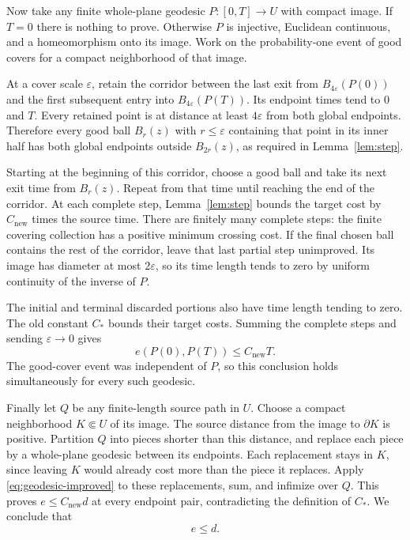\documentclass[11pt]{article}
\theoremstyle{definition}
\theoremstyle{remark}
\newcommand{\eps}{\varepsilon}
\begin{document}
Now take any finite whole-plane geodesic $P:[0,T]\to U$
with compact image. If $T=0$ there is nothing to prove.
Otherwise $P$ is injective, Euclidean continuous, and a
homeomorphism onto its image. Work on the probability-one
event of good covers for a compact neighborhood of that image.

At a cover scale $\eps$, retain the corridor between the last
exit from $B_{4\eps}(P(0))$ and the first subsequent entry
into $B_{4\eps}(P(T))$. Its endpoint times tend to $0$ and
$T$. Every retained point is at distance at least $4\eps$
from both global endpoints. Therefore every good ball
$B_r(z)$ with $r\le\eps$ containing that point in its inner
half has both global endpoints outside $B_{2r}(z)$, as
required in Lemma~\ref{lem:step}.

Starting at the beginning of this corridor, choose a good ball
and take its next exit time from $B_r(z)$. Repeat from that
time until reaching the end of the corridor. At each complete
step, Lemma~\ref{lem:step} bounds the target cost by
$C_{\mathrm{new}}$ times the source time. There are finitely
many complete steps: the finite covering collection has a
positive minimum crossing cost. If the final chosen ball
contains the rest of the corridor, leave that last partial
step unimproved. Its image has diameter at most $2\eps$,
so its time length tends to zero by uniform continuity of
the inverse of $P$.

The initial and terminal discarded portions also have time
length tending to zero. The old constant $C_*$ bounds their
target costs. Summing the complete steps and sending
$\eps\to0$ gives
\begin{equation}\label{eq:geodesic-improved}
                  e(P(0),P(T))\le C_{\mathrm{new}}T.
\end{equation}
The good-cover event was independent of $P$, so this conclusion
holds simultaneously for every such geodesic.

Finally let $Q$ be any finite-length source path in $U$.
Choose a compact neighborhood $K\Subset U$ of its image.
The source distance from the image to $\partial K$ is positive.
Partition $Q$ into pieces shorter than this distance, and
replace each piece by a whole-plane geodesic between its
endpoints. Each replacement stays in $K$, since leaving $K$
would already cost more than the piece it replaces. Apply
\eqref{eq:geodesic-improved} to these replacements, sum, and
infimize over $Q$. This proves $e\le C_{\mathrm{new}}d$ at
every endpoint pair, contradicting the definition of $C_*$.
We conclude that
\begin{equation}\label{eq:one-sided}
                              e\le d.
\end{equation}
\end{document}
